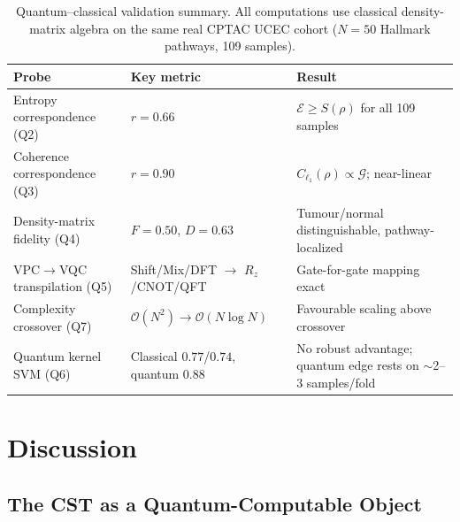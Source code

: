 \documentclass[preprint,12pt,amsmath,amssymb,superscriptaddress,floatfix]{revtex4-2}
\begin{document}
\begin{table}[ht]
\centering\small
\caption{Quantum--classical validation summary. All computations use classical
density-matrix algebra on the same real CPTAC UCEC cohort ($N=50$ Hallmark
pathways, 109 samples).}
\label{tab:cst_quantum_results}
\begin{tabular}{p{4.4cm}p{3.2cm}p{4.9cm}}
\toprule
Probe & Key metric & Result \\
\midrule
Entropy correspondence (Q2) & $r=0.66$ & $\mathcal{E}\ge S(\rho)$ for all 109 samples \\
Coherence correspondence (Q3) & $r=0.90$ & $C_{\ell_1}(\rho)\propto\mathcal{G}$; near-linear \\
Density-matrix fidelity (Q4) & $F=0.50$, $D=0.63$ & Tumour/normal distinguishable, pathway-localized \\
VPC$\to$VQC transpilation (Q5) & Shift/Mix/DFT $\to$ $R_z$/CNOT/QFT & Gate-for-gate mapping exact \\
Complexity crossover (Q7) & $\mathcal{O}(N^2)\!\to\!\mathcal{O}(N\log N)$ & Favourable scaling above crossover \\
Quantum kernel SVM (Q6) & Classical $0.77$/$0.74$, quantum $0.88$ & No robust advantage; quantum edge rests on $\sim$2--3 samples/fold \\
\bottomrule
\end{tabular}
\end{table}




\section{Discussion}
\label{sec:discussion}

\subsection{The CST as a Quantum-Computable Object}
\end{document}
